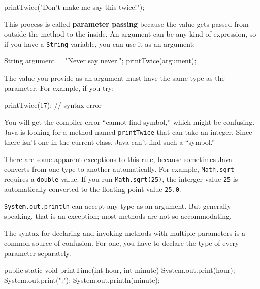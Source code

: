\documentclass[12pt]{book}
\makeatletter
\theoremstyle{exercise}
\newcommand{\java}[1]{\verb"#1"}
\renewcommand\subsection{\@startsection{subsection}{2}{\z@}%
    {-3.25ex\@plus -1ex \@minus -.2ex}%
    {0.3ex \@plus .2ex}%
    {\normalfont\large\bfseries}}
\newcommand{\java}[1]{\lstinline{#1}} %
\makeatother
\begin{document}
\begin{code}
    printTwice("Don't make me say this twice!");
\end{code}


This process is called {\bf parameter passing} because the value gets passed from outside the method to the inside.
An argument can be any kind of expression, so if you have a \java{String} variable, you can use it as an argument:

\begin{code}
    String argument = "Never say never.";
    printTwice(argument);
\end{code}

The value you provide as an argument must have the same type as the parameter.
For example, if you try:

\begin{code}
    printTwice(17);  // syntax error
\end{code}

You will get the compiler error ``cannot find symbol,'' which might be confusing.
Java is looking for a method named \java{printTwice} that can take an integer.
Since there isn't one in the current class, Java can't find such a ``symbol.''

There are some apparent exceptions to this rule, because sometimes Java converts from one type to another automatically.
For example, \java{Math.sqrt} requires a \java{double} value.
If you run \java{Math.sqrt(25)}, the interger value \java{25} is automatically converted to the floating-point value \java{25.0}.

\java{System.out.println} can accept any type as an argument.
But generally speaking, that is an exception; most methods are not so accommodating.

\label{time}


The syntax for declaring and invoking methods with multiple parameters is a common source of confusion.
For one, you have to declare the type of every parameter separately.

\begin{code}
    public static void printTime(int hour, int minute) {
        System.out.print(hour);
        System.out.print(":");
        System.out.println(minute);
    }
\end{code}
\end{document}
